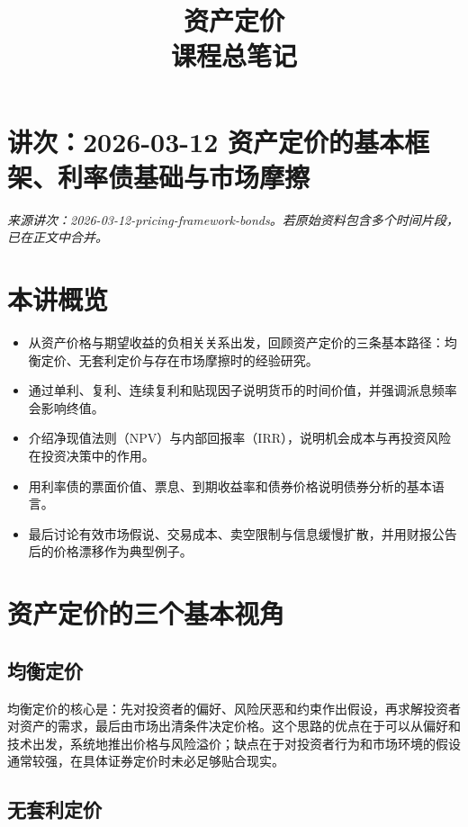\documentclass[UTF8,11pt,a4paper]{ctexart}
\title{ 资产定价 \\ \large 课程总笔记 }
\author{}
\date{}
\begin{document}
\maketitle

\tableofcontents

\newpage

\section{讲次：2026-03-12 资产定价的基本框架、利率债基础与市场摩擦}
\textit{来源讲次：2026-03-12-pricing-framework-bonds。若原始资料包含多个时间片段，已在正文中合并。}

\section{本讲概览}

\begin{itemize}
  \item 从资产价格与期望收益的负相关关系出发，回顾资产定价的三条基本路径：均衡定价、无套利定价与存在市场摩擦时的经验研究。
  \item 通过单利、复利、连续复利和贴现因子说明货币的时间价值，并强调派息频率会影响终值。
  \item 介绍净现值法则（NPV）与内部回报率（IRR），说明机会成本与再投资风险在投资决策中的作用。
  \item 用利率债的票面价值、票息、到期收益率和债券价格说明债券分析的基本语言。
  \item 最后讨论有效市场假说、交易成本、卖空限制与信息缓慢扩散，并用财报公告后的价格漂移作为典型例子。
\end{itemize}

\section{资产定价的三个基本视角}

\subsection{均衡定价}

均衡定价的核心是：先对投资者的偏好、风险厌恶和约束作出假设，再求解投资者对资产的需求，最后由市场出清条件决定价格。这个思路的优点在于可以从偏好和技术出发，系统地推出价格与风险溢价；缺点在于对投资者行为和市场环境的假设通常较强，在具体证券定价时未必足够贴合现实。

\subsection{无套利定价}
\end{document}
